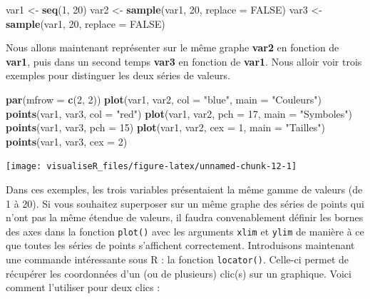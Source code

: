 \documentclass[]{article}
\newenvironment{Shaded}{\begin{snugshade}}{\end{snugshade}}
\newcommand{\DataTypeTok}[1]{\textcolor[rgb]{0.13,0.29,0.53}{#1}}
\newcommand{\DecValTok}[1]{\textcolor[rgb]{0.00,0.00,0.81}{#1}}
\newcommand{\KeywordTok}[1]{\textcolor[rgb]{0.13,0.29,0.53}{\textbf{#1}}}
\newcommand{\NormalTok}[1]{#1}
\newcommand{\OtherTok}[1]{\textcolor[rgb]{0.56,0.35,0.01}{#1}}
\newcommand{\StringTok}[1]{\textcolor[rgb]{0.31,0.60,0.02}{#1}}
\begin{document}
\begin{Shaded}
\begin{Highlighting}[]
\NormalTok{var1 <-}\StringTok{ }\KeywordTok{seq}\NormalTok{(}\DecValTok{1}\NormalTok{, }\DecValTok{20}\NormalTok{)}
\NormalTok{var2 <-}\StringTok{ }\KeywordTok{sample}\NormalTok{(var1, }\DecValTok{20}\NormalTok{, }\DataTypeTok{replace =} \OtherTok{FALSE}\NormalTok{)}
\NormalTok{var3 <-}\StringTok{ }\KeywordTok{sample}\NormalTok{(var1, }\DecValTok{20}\NormalTok{, }\DataTypeTok{replace =} \OtherTok{FALSE}\NormalTok{)}
\end{Highlighting}
\end{Shaded}

Nous allons maintenant représenter sur le même graphe \textbf{var2} en fonction de \textbf{var1}, puis dans un second temps \textbf{var3} en fonction de \textbf{var1}. Nous alloir voir trois exemples pour distinguer les deux séries de valeurs.

\begin{Shaded}
\begin{Highlighting}[]
\KeywordTok{par}\NormalTok{(}\DataTypeTok{mfrow =} \KeywordTok{c}\NormalTok{(}\DecValTok{2}\NormalTok{, }\DecValTok{2}\NormalTok{))}
\KeywordTok{plot}\NormalTok{(var1, var2, }\DataTypeTok{col =} \StringTok{"blue"}\NormalTok{, }\DataTypeTok{main =} \StringTok{"Couleurs"}\NormalTok{)}
\KeywordTok{points}\NormalTok{(var1, var3, }\DataTypeTok{col =} \StringTok{"red"}\NormalTok{)}
\KeywordTok{plot}\NormalTok{(var1, var2, }\DataTypeTok{pch =} \DecValTok{17}\NormalTok{, }\DataTypeTok{main =} \StringTok{"Symboles"}\NormalTok{)}
\KeywordTok{points}\NormalTok{(var1, var3, }\DataTypeTok{pch =} \DecValTok{15}\NormalTok{)}
\KeywordTok{plot}\NormalTok{(var1, var2, }\DataTypeTok{cex =} \DecValTok{1}\NormalTok{, }\DataTypeTok{main =} \StringTok{"Tailles"}\NormalTok{)}
\KeywordTok{points}\NormalTok{(var1, var3, }\DataTypeTok{cex =} \DecValTok{2}\NormalTok{)}
\end{Highlighting}
\end{Shaded}

\begin{center}\texttt{[image: visualiseR\_files/figure-latex/unnamed-chunk-12-1]} \end{center}

Dans ces exemples, les trois variables présentaient la même gamme de valeurs (de 1 à 20). Si vous souhaitez superposer sur un même graphe des séries de points qui n'ont pas la même étendue de valeurs, il faudra convenablement définir les bornes des axes dans la fonction \texttt{plot()} avec les arguments \texttt{xlim} et \texttt{ylim} de manière à ce que toutes les séries de points s'affichent correctement.
Introduisons maintenant une commande intéressante sous R : la fonction \texttt{locator()}. Celle-ci permet de récupérer les coordonnées d'un (ou de plusieurs) clic(s) sur un graphique. Voici comment l'utiliser pour deux clics :
\end{document}
